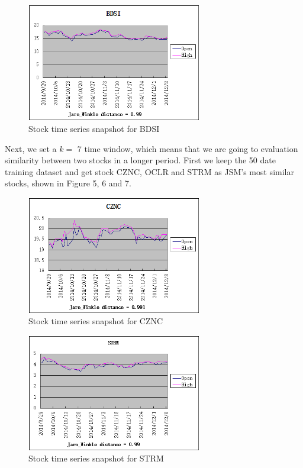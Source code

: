 \documentclass[10pt, conference, compsocconf]{IEEEtran}
\begin{document}
\par
\vspace{2mm}
 \begin{figure}[!h]
\includegraphics[width=3in]{figures/BDSI}
\caption{Stock time series snapshot for BDSI}
\vspace{1mm}
\end{figure}
\par

\vspace{1mm}
\par
Next, we set a $k=$ 7 time window, which means that we are going to evaluation similarity between two stocks in a longer period. First we keep the 50 date training dataset and get stock CZNC, OCLR and STRM as JSM's most similar stocks, shown in Figure 5, 6 and 7.
\par
 \begin{figure}[!h]
\vspace{2mm}
\includegraphics[width=3in]{figures/CZNC}
\caption{Stock time series snapshot for CZNC}
\vspace{1mm}
\end{figure}
\par

\par
 \begin{figure}[!h]
\vspace{2mm}
\includegraphics[width=3in]{figures/STRM}
\caption{Stock time series snapshot for STRM}
\vspace{1mm}
\end{figure}
\par
\end{document}
